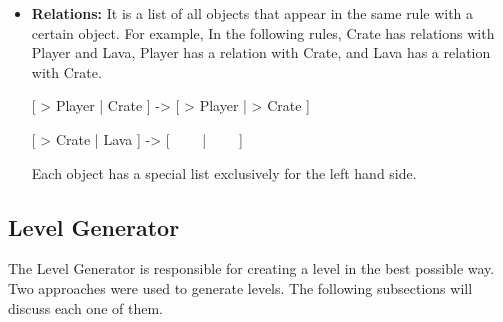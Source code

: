\begin{itemize}
	\begin{center}
		[ > Player | Crate ] -> [ > Player | > Crate ]
	\end{center}
	\begin{center}
		[ > Crate | Crate ] -> [ > Crate | > Crate ]
	\end{center}
	The Crate object appeared in the both rules. The first rule the Crate object appeared once, while in the second rule it appeared twice. This means the minimum required number of Crates is two. This is not the case when an object has a Create behavior. Create rules are responsible for generating objects. The Minimum Required Number of the Create objects is updated to reflect the least number of appearances in all the Create rules. For example the following rules have two Create rules (the first and the third).
	\begin{center}
		[ > Player | \ \ \ \ ] -> [ Crate | Player ]
	\end{center}
	\begin{center}
		[ > Crate | Crate ] -> [ > Crate | > Crate ]
	\end{center}
	\begin{center}
		[ Gem | Crate | Gem ] -> [ Crate | Crate | Crate ]
	\end{center}
	The number of Crate objects in each rule are 0, 2, 1 respectively. In normal case, the minimum required number of Crate object will be 2. Crate object have Create behavior (in both the first and the third rule) then the minimum required number of objects will be zero instead.
	\item \textbf{Relations:} It is a list of all objects that appear in the same rule with a certain object. For example, In the following rules, Crate has relations with Player and Lava, Player has a relation with Crate, and Lava has a relation with Crate.
	\begin{center}
		[ > Player | Crate ] -> [ > Player | > Crate ]
	\end{center}
	\begin{center}
		[ > Crate | Lava ] -> [ \ \ \ \ | \ \ \ \ ]
	\end{center}
	Each object has a special list exclusively for the left hand side.	
\end{itemize}

\subsection{Level Generator}
The Level Generator is responsible for creating a level in the best possible way. Two approaches were used to generate levels. The following subsections will discuss each one of them.

